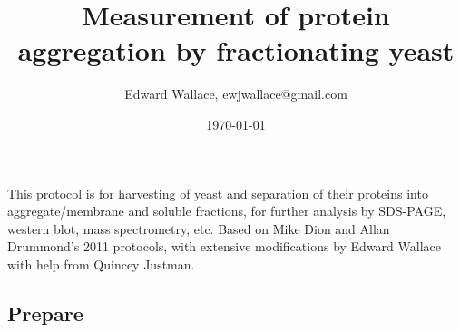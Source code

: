 \documentclass{article}
\begin{document}
\title{Measurement of protein aggregation by fractionating yeast}
\author{Edward Wallace, ewjwallace@gmail.com}
\date{\today}
\maketitle

This protocol is for harvesting of yeast and separation of their proteins into aggregate/membrane and soluble fractions, for further analysis by SDS-PAGE, western blot, mass spectrometry, etc. Based on Mike Dion and Allan Drummond's 2011 protocols, with extensive modifications by Edward Wallace with help from Quincey Justman. 

\subsection*{Prepare}
\end{document}
